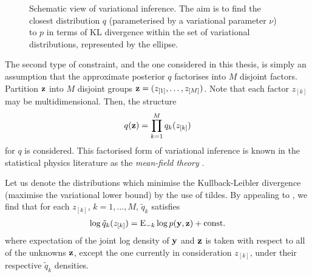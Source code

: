 \begin{figure}[htb]
  \centering
  \vspace{-1em}
  \caption[Schematic view of variational inference. The aim is to find the closest distribution $q$ (parameterised by a variational parameter $\nu$) to $p$ in terms of KL divergence within the set of variational distributions, represented by the ellipse.]{Schematic view of variational inference\footnotemark. The aim is to find the closest distribution $q$ (parameterised by a variational parameter $\nu$) to $p$ in terms of KL divergence within the set of variational distributions, represented by the ellipse.}
\end{figure}

The second type of constraint, and the one considered in this thesis, is simply an assumption that the approximate posterior $q$ factorises into $M$ disjoint factors.
Partition ${\mathbf z}$ into $M$ disjoint groups ${\mathbf z} = (z_{[1]},\dots,z_{[M]})$.
Note that each factor $z_{[k]}$ may be multidimensional.
Then, the structure
\[
  q({\mathbf z}) = \prod_{k=1}^M q_k(z_{[k]})
\]
for $q$ is considered.
This factorised form of variational inference is known in the statistical physics literature as the \emph{mean-field theory} \citep{itzykson1991statistical}.

Let us denote the distributions which minimise the Kullback-Leibler divergence (maximise the variational lower bound) by the use of tildes.
By appealing to \citet[equation 10.9, p. 466]{bishop2006pattern}, we find that for each $z_{[k]}$, $k=1,\dots,M$, $\tilde q_k$ satisfies
\begin{align}\label{eq:qtilde}
  \log \tilde q_k(z_{[k]}) = \operatorname{E}_{-k} \log p({\mathbf y},{\mathbf z}) + \text{const.}\hspace{0.01em}
\end{align}
where expectation of the joint log density of ${\mathbf y}$ and ${\mathbf z}$ is taken with respect to all of the unknowns ${\mathbf z}$, except the one currently in consideration $z_{[k]}$, under their respective $\tilde q_k$ densities. 

